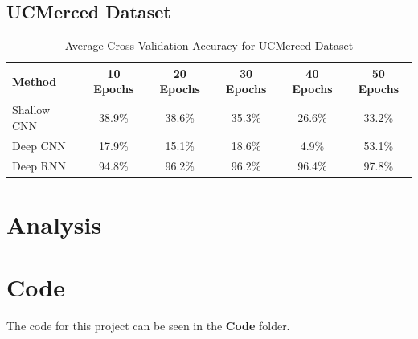 \documentclass[12pt]{article}
\begin{document}
	\subsection{UCMerced Dataset}
	\begin{table}[h!]
		\begin{center}
			\caption{Average Cross Validation Accuracy for UCMerced Dataset}
			\label{table:ucm}
			\begin{tabular}{l | S | S | S | S |  S}
				\textbf{Method} & \textbf{10 Epochs} & \textbf{20 Epochs} & \textbf{30 Epochs} & \textbf{40 Epochs} & \textbf{50 Epochs} \\
				\hline
				Shallow CNN & 38.9\% & 38.6\% & 35.3\% & 26.6\% & 33.2\% \\
				Deep CNN & 17.9\% & 15.1\% & 18.6\% & 4.9\% & 53.1\% \\
				Deep RNN & 94.8\% & 96.2\% & 96.2\% & 96.4\% & 97.8\% \\
				
			
			\end{tabular}					
		
		
		\end{center}
	
	\end{table}
	
	\section{Analysis}
	
	\section{Code}
	
	The code for this project can be seen in the \textbf{Code} folder. 
	
	
	\newpage
	 
	
\end{document}
